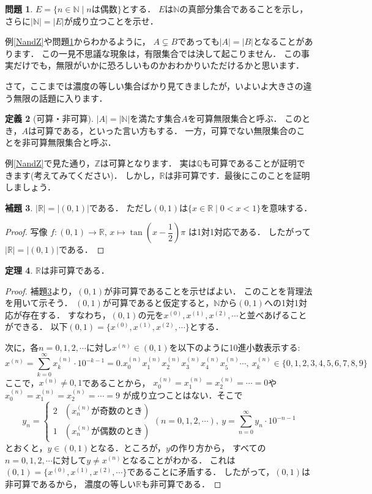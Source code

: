 ﻿\documentclass[./main]{subfiles} %
\theoremstyle{definition}
\newtheorem{hamadadefi}{定義}[section]
\newtheorem{hamadaqst}[hamadadefi]{問題}
\newtheorem{hamadathm}[hamadadefi]{定理}
\newtheorem{hamadalem}[hamadadefi]{補題}
\begin{document}
\begin{hamadaqst}
\label{Nand2N}
$E=\{n\in\mathbb{N}\mid nは偶数\}$とする．
$E$は$\mathbb{N}$の真部分集合であることを示し，
さらに$|\mathbb{N}|=|E|$が成り立つことを示せ．
\end{hamadaqst}

例\ref{NandZ}や問題\ref{Nand2N}からわかるように，
$A\subsetneq B$であっても$|A|=|B|$となることがあります．
この一見不思議な現象は，有限集合では決して起こりません．
この事実だけでも，無限がいかに恐ろしいものかおわかりいただけるかと思います．

さて，ここまでは濃度の等しい集合ばかり見てきましたが，いよいよ大きさの違う無限の話題に入ります．

\begin{hamadadefi}[可算・非可算]
$|A|=|\mathbb{N}|$を満たす集合$A$を可算無限集合と呼ぶ．
このとき，$A$は可算である，といった言い方もする．
一方，可算でない無限集合のことを非可算無限集合と呼ぶ．
\end{hamadadefi}

例\ref{NandZ}で見た通り，$\mathbb{Z}$は可算となります．
実は$\mathbb{Q}$も可算であることが証明できます(考えてみてください)．
しかし，$\mathbb{R}$は非可算です．最後にこのことを証明しましょう．

\begin{hamadalem}
\label{real01}
$|\mathbb{R}|=|(0,1)|$である．
ただし$(0,1)$は$\{x\in\mathbb{R}\mid0<x<1\}$を意味する．
\end{hamadalem}
\begin{proof}
写像
$f\colon(0,1)\to\mathbb{R}$, $x\mapsto\tan\left(x-\dfrac{1}{2}\right)\pi$
は1対1対応である．
したがって$|\mathbb{R}|=|(0,1)|$である．
\end{proof}

\begin{hamadathm}
\label{cantor}
$\mathbb{R}$は非可算である．
\end{hamadathm}
\begin{proof}
補題\ref{real01}より，$(0,1)$が非可算であることを示せばよい．
このことを背理法を用いて示そう．
$(0,1)$が可算であると仮定すると，$\mathbb{N}$から$(0,1)$への1対1対応が存在する．
すなわち，$(0,1)$の元を$x^{(0)},x^{(1)},x^{(2)},\cdots$と並べあげることができる．
以下$(0,1)=\{x^{(0)},x^{(1)},x^{(2)},\cdots\}$とする．

次に，各$n=0,1,2,\cdots$に対し$x^{(n)}\in(0,1)$を以下のように10進小数表示する:
\[
x^{(n)}=\sum_{k=0}^\infty x_k^{(n)}\cdot10^{-k-1}
=0.x_0^{(n)}x_1^{(n)}x_2^{(n)}x_3^{(n)}x_4^{(n)}x_5^{(n)}\cdots,\ 
x_k^{(n)}\in\{0,1,2,3,4,5,6,7,8,9\}
\]
ここで，$x^{(n)}\neq0,1$であることから，
$x_0^{(n)}=x_1^{(n)}=x_2^{(n)}=\cdots=0$や$x_0^{(n)}=x_1^{(n)}=x_2^{(n)}=\cdots=9$
が成り立つことはない．そこで
\[
y_n=
\begin{cases}
2 & (x_n^{(n)}が奇数のとき)\\
1 & (x_n^{(n)}が偶数のとき)
\end{cases}
(n=0,1,2,\cdots),\ 
y=\sum_{n=0}^\infty y_n\cdot10^{-n-1}
\]
とおくと，$y\in(0,1)$となる．ところが，$y$の作り方から，
すべての$n=0,1,2,\cdots$に対して$y\neq x^{(n)}$となることがわかる．
これは$(0,1)=\{x^{(0)},x^{(1)},x^{(2)},\cdots\}$であることに矛盾する．
したがって，$(0,1)$は非可算であるから，
濃度の等しい$\mathbb{R}$も非可算である．
\end{proof}
\end{document}
